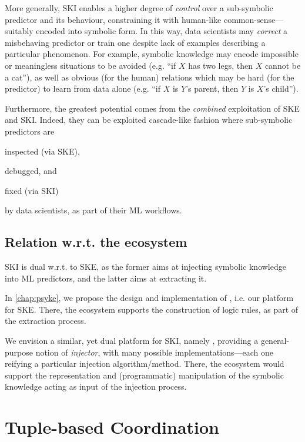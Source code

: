 \documentclass[12pt,a4paper,openright,twoside]{book}
\begin{document}
More generally, SKI enables a higher degree of \emph{control} over a sub-symbolic predictor and its behaviour, constraining it with human-like common-sense---suitably encoded into symbolic form.
%
In this way, data scientists may \emph{correct} a misbehaving predictor or train one despite lack of examples describing a particular phenomenon.
%
For example, symbolic knowledge may encode impossible or meaningless situations to be avoided (e.g. ``if $X$ has two legs, then $X$ cannot be a cat''), as well as obvious (for the human) relations which may be hard (for the predictor) to learn from data alone (e.g. ``if $X$ is $Y$'s parent, then $Y$ is $X$'s child'').

Furthermore, the greatest potential comes from the \emph{combined} exploitation of SKE and SKI.
%
Indeed, they can be exploited cascade-like fashion where sub-symbolic predictors are
%
\begin{inlinelist}
    \item inspected (via SKE),
    \item debugged, and
    \item fixed (via SKI)
\end{inlinelist}
%
by data scientists, as part of their ML workflows.

\subsection{Relation w.r.t. the ecosystem}

SKI is dual w.r.t. to SKE, as the former aims at injecting symbolic knowledge into ML predictors, and the latter aims at extracting it.

In \cref{chap:psyke}, we propose the design and implementation of \psyke{}, i.e. our platform for SKE.
%
There, the \twopkt{} ecosystem supports the construction of logic rules, as part of the extraction process.

We envision a similar, yet dual platform for SKI, namely \psyki{}, providing a general-purpose notion of \emph{injector}, with many possible implementations---each one reifying a particular injection algorithm/method.
%
There, the \twopkt{} ecosystem would support the representation and (programmatic) manipulation of the symbolic knowledge acting as input of the injection process.

\section{Tuple-based Coordination}
\label{sec:tuple-based-coord}
\end{document}
